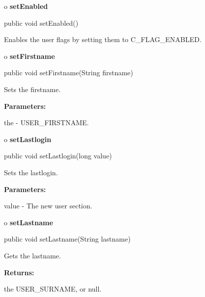 o {\bf setEnabled} 

\begin{PRE}
 public void setEnabled()
\end{PRE}

\begin{description}
\htmlDD Enables the user flags by setting them to C\_FLAG\_ENABLED. 

\end{description}

o {\bf setFirstname} 

\begin{PRE}
 public void setFirstname(String firstname)
\end{PRE}

\begin{description}
\htmlDD Sets the firstname. 

\begin{description}
\item {\bf Parameters:}  

the - USER\_FIRSTNAME.  
\end{description}

\end{description}

o {\bf setLastlogin} 

\begin{PRE}
 public void setLastlogin(long value)
\end{PRE}

\begin{description}
\htmlDD Sets the lastlogin. 

\begin{description}
\item {\bf Parameters:}  

value - The new user section.  
\end{description}

\end{description}

o {\bf setLastname} 

\begin{PRE}
 public void setLastname(String lastname)
\end{PRE}

\begin{description}
\htmlDD Gets the lastname. 

\begin{description}
\item {\bf Returns:}  

the USER\_SURNAME, or null.  
\end{description}

\end{description}

